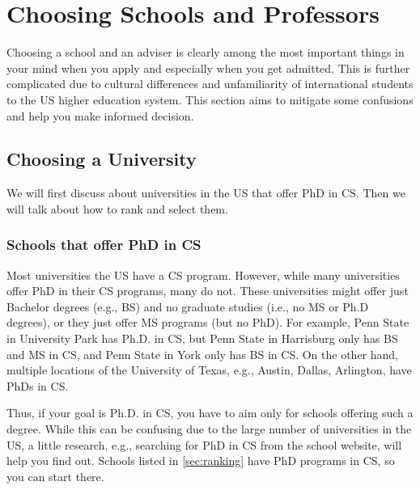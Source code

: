 \documentclass[oneside,11pt,dvipsnames]{book}
\begin{document}
\chapter{Choosing Schools and Professors}\label{sec:schoolsandprofs}

Choosing a school and an adviser is clearly among the most important things in your mind when you apply and especially when you get admitted.  This is further complicated due to cultural differences and unfamiliarity of  international students to the US higher education system.  This section aims to mitigate some confusions and help you make informed decision.

\section{Choosing a University}

We will first discuss about universities in the US that offer PhD in CS. Then we will talk about how to rank and select them.

\subsection{Schools that offer PhD in CS}

Most universities the US have a CS program.
However, while many universities offer PhD in their CS programs, many do not.  These universities might offer just Bachelor degrees (e.g., BS) and no graduate studies (i.e., no MS or Ph.D degrees), or they just offer MS programs (but no PhD). For example, Penn State in University Park has Ph.D. in CS,  but Penn State in Harrisburg only has BS and MS in CS, and Penn State in York only has BS in CS.  On the other hand, multiple locations of the University of Texas, e.g., Austin, Dallas, Arlington, have PhDs in CS.

Thus, if your goal is Ph.D. in CS, you have to aim only for schools offering such a degree.  %
While this can be confusing due to the large number of universities in the US, a little research, e.g., searching for PhD in CS from the school website, will help you find out. Schools listed in \autoref{sec:ranking} have PhD programs in CS, so you can start there.

\end{document}
